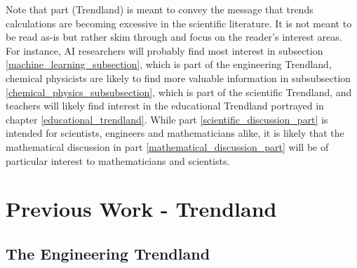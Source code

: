 \documentclass[11pt]{book}
\begin{document}
Note that part \ref{trendland_part} (Trendland) is meant to convey
the message that trends calculations are becoming excessive in the
scientific literature. It is not meant to be read as-is but rather
skim through and focus on the reader's interest areas. For instance,
AI researchers will probably find most interest in subsection \ref{machine_learning_subsection},
which is part of the engineering Trendland, chemical physicists are
likely to find more valuable information in subsubsection \ref{chemical_physics_subsubsection},
which is part of the scientific Trendland, and teachers will likely
find interest in the educational Trendland portrayed in chapter \ref{educational_trendland}.
While part \ref{scientific_discussion_part} is intended for scientists,
engineers and mathematicians alike, it is likely that the mathematical
discussion in part \ref{mathematical_discussion_part} will be of
particular interest to mathematicians and scientists.

 
 
 
 

 \printnomenclature{}

\part{Previous Work - Trendland}

\label{trendland_part}

 

\chapter{The Engineering Trendland}
\end{document}
